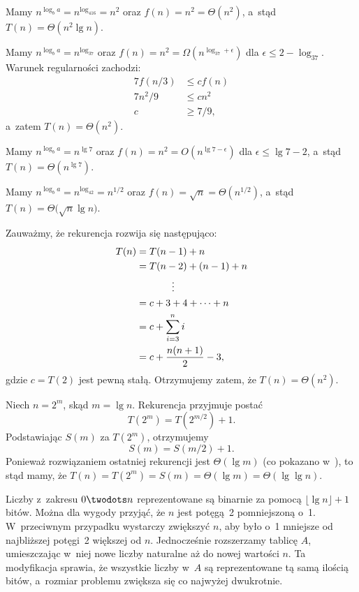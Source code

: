 \subproblem %
Mamy $n^{\log_ba}=n^{\log_416}=n^2$ oraz $f(n)=n^2=\Theta(n^2)$, a~stąd $T(n)=\Theta(n^2\lg n)$.

\subproblem %
Mamy $n^{\log_ba}=n^{\log_37}$ oraz $f(n)=n^2=\Omega(n^{\log_37+\epsilon})$ dla $\epsilon\le2-\log_37$. Warunek regularności zachodzi:
\begin{align*}
	7f(n/3) &\le cf(n) \\
	7n^2\!/9 &\le cn^2 \\
	c &\ge 7/9,
\end{align*}
a~zatem $T(n)=\Theta(n^2)$.

\subproblem %
Mamy $n^{\log_ba}=n^{\lg7}$ oraz $f(n)=n^2=O(n^{\lg7-\epsilon})$ dla $\epsilon\le\lg7-2$, a~stąd $T(n)=\Theta(n^{\lg7})$.

\subproblem %
Mamy $n^{\log_ba}=n^{\log_42}=n^{1/2}$ oraz $f(n)=\sqrt{n}=\Theta(n^{1/2})$, a~stąd $T(n)=\Theta\bigl(\!\sqrt{n}\lg n\bigr)$.

\subproblem %
Zauważmy, że rekurencja rozwija się następująco:
\begin{align*}
	T(n) &= T(n-1)+n \\
	&= T(n-2)+(n-1)+n \\
	&\hspace{.5in}\vdots \\
	&= c+3+4+\dots+n \\
	&= c+\sum_{i=3}^ni \\
	&= c+\frac{n(n+1)}{2}-3,
\end{align*}
gdzie $c=T(2)$ jest pewną stałą. Otrzymujemy zatem, że $T(n)=\Theta(n^2)$.

\subproblem %
Niech $n=2^m$, skąd $m=\lg n$. Rekurencja przyjmuje postać
\[
	T(2^m) = T(2^{m/2})+1.
\]
Podstawiając $S(m)$ za $T(2^m)$, otrzymujemy
\[
	S(m) = S(m/2)+1.
\]
Ponieważ rozwiązaniem ostatniej rekurencji jest $\Theta(\lg m)$ (co pokazano w~), to stąd mamy, że $T(n)=T(2^m)=S(m)=\Theta(\lg m)=\Theta(\lg\lg n)$.

Liczby z~zakresu $0\twodots n$ reprezentowane są binarnie za pomocą $\lfloor\lg n\rfloor+1$ bitów. Można dla wygody przyjąć, że $n$ jest potęgą~2 pomniejszoną o~1. W~przeciwnym przypadku wystarczy zwiększyć $n$, aby było o~1 mniejsze od najbliższej potęgi~2 większej od $n$. Jednocześnie rozszerzamy tablicę $A$, umieszczając w~niej nowe liczby naturalne aż do nowej wartości $n$. Ta modyfikacja sprawia, że wszystkie liczby w~$A$ są reprezentowane tą samą ilością bitów, a~rozmiar problemu zwiększa się co najwyżej dwukrotnie.

